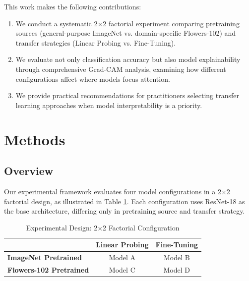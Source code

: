 \documentclass[11pt,a4paper]{article}
\begin{document}
This work makes the following contributions:

\begin{enumerate}
    \item We conduct a systematic 2×2 factorial experiment comparing pretraining sources (general-purpose ImageNet vs. domain-specific Flowers-102) and transfer strategies (Linear Probing vs. Fine-Tuning).

    \item We evaluate not only classification accuracy but also model explainability through comprehensive Grad-CAM analysis, examining how different configurations affect where models focus attention.

    \item We provide practical recommendations for practitioners selecting transfer learning approaches when model interpretability is a priority.
\end{enumerate}

\section{Methods}

\subsection{Overview}

Our experimental framework evaluates four model configurations in a 2×2 factorial design, as illustrated in Table \ref{tab:experimental_design}. Each configuration uses ResNet-18 \citep{he2016deep} as the base architecture, differing only in pretraining source and transfer strategy.

\begin{table}[H]
\centering
\caption{Experimental Design: 2×2 Factorial Configuration}
\label{tab:experimental_design}
\begin{tabular}{lcc}
\toprule
& \textbf{Linear Probing} & \textbf{Fine-Tuning} \\
\midrule
\textbf{ImageNet Pretrained} & Model A & Model B \\
\textbf{Flowers-102 Pretrained} & Model C & Model D \\
\bottomrule
\end{tabular}
\end{table}
\end{document}

